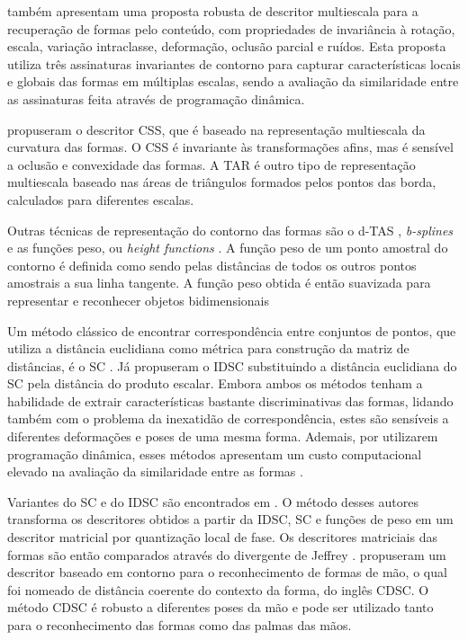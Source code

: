  também apresentam uma proposta robusta de descritor multiescala para a recuperação de formas pelo conteúdo, com propriedades de invariância à rotação, escala, variação intraclasse, deformação,  oclusão parcial e ruídos. Esta proposta utiliza três assinaturas invariantes de contorno para capturar características locais e globais das formas em múltiplas escalas, sendo a avaliação da similaridade entre as assinaturas feita através de programação dinâmica.


 propuseram o descritor \ac{CSS}, que é baseado na representação multiescala da curvatura das formas. O \ac{CSS} é invariante às transformações afins, mas é sensível a oclusão e convexidade das formas. A \ac{TAR} \cite{Alajlan20117} é outro tipo de representação multiescala baseado nas áreas de triângulos formados pelos pontos das borda, calculados para diferentes escalas. 

Outras técnicas de representação do contorno das formas são o \ac{d-TAS} \cite{4202050}, \textit{b-splines} \cite{1168520} e as funções peso, ou \textit{height functions} \cite{Wang2012134}. A função peso de um ponto amostral do contorno é definida como sendo pelas distâncias de todos os outros pontos amostrais a sua linha tangente. A função peso obtida é então suavizada para representar e reconhecer objetos bidimensionais

Um método clássico de encontrar correspondência entre conjuntos de pontos, que utiliza a distância euclidiana como métrica para construção da matriz de distâncias, é o \ac{SC} \cite{Belongie:2002}. Já  propuseram o \ac{IDSC} substituindo a distância euclidiana do \ac{SC} pela distância do produto escalar. Embora ambos os métodos tenham a habilidade de extrair características bastante discriminativas das formas, lidando também com o problema da inexatidão de correspondência, estes são sensíveis a diferentes deformações e poses de uma mesma forma. Ademais, por utilizarem programação dinâmica, esses métodos apresentam um custo computacional elevado na avaliação da similaridade entre as formas \cite{FreitasS.TorresMiranda2016}.

Variantes do \ac{SC} e do \ac{IDSC} são encontrados em . O método desses autores transforma os descritores obtidos a partir da \ac{IDSC}, \ac{SC} e funções de peso em um descritor matricial por quantização local de fase. Os descritores matriciais das formas são então comparados através do divergente de Jeffrey \cite{Ullah1996}.  propuseram um descritor baseado em contorno para o reconhecimento de formas de mão, o qual foi nomeado de distância coerente do contexto da forma, do inglês \ac{CDSC}. O método \ac{CDSC} é robusto a diferentes poses da mão e pode ser utilizado tanto para o reconhecimento das formas como das palmas das mãos.  

